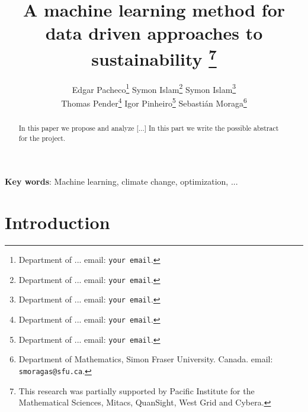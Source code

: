\documentclass[11pt]{article}
\title{A machine learning method for \\ data driven approaches to sustainability
\thanks{This research was 
partially supported by  Pacific Institute for the Mathematical Sciences, Mitacs, QuanSight, West Grid and Cybera.}}
\author{{\sc Edgar Pacheco}\thanks{Department of ...
email: {\tt your email}.}
\quad
{\sc Symon Islam}\thanks{Department of ...
email: {\tt your email}.}
\quad
{\sc Symon Islam}\thanks{Department of ...
email: {\tt your email}.}
\\
{\sc Thomas Pender}\thanks{Department of ...
email: {\tt your email}.}
\quad
{\sc Igor Pinheiro}\thanks{Department of ...
email: {\tt your email}.}
\quad
{\sc Sebasti\'an Moraga}\thanks{ Department of Mathematics, Simon Fraser University. Canada.
email: {\tt smoragas@sfu.ca}.}}
\date{ }
\numberwithin{equation}{section}
\numberwithin{figure}{section}
\begin{document}
\maketitle
{}
\begin{abstract}
\noindent
In this paper we propose and analyze [...] In this part we write the possible abstract for the project.

\end{abstract}

\noindent
{\bf Key words}: Machine learning, climate change, optimization, ...

\smallskip\noindent

                                                  

\section{Introduction}\label{section1}
\end{document}
